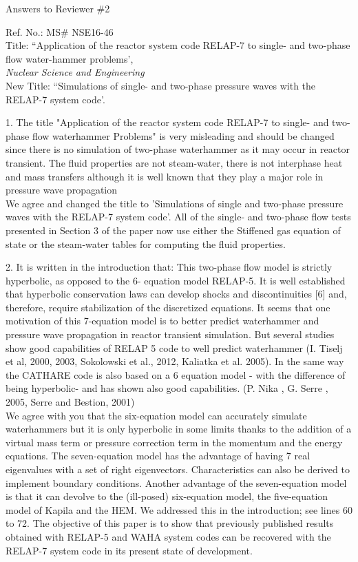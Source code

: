 \documentclass{article}
\begin{document}
\begin{center}
{ \Large Answers to Reviewer \#2}
\end{center}

\bigskip

\noindent Ref. No.: MS\# NSE16-46\\
Title: ``Application of the reactor system code RELAP-7 to single- and two-phase flow water-hammer problems', \\
{\it Nuclear Science and Engineering}\\
New Title: ``Simulations of single- and two-phase pressure waves with the RELAP-7 system code'.

\bigskip
\bigskip

{\color{blue}
1. The title "Application of the reactor system code RELAP-7 to single- and two-phase flow waterhammer Problems" is very misleading and should be changed since there is no simulation of two-phase waterhammer as it may occur in reactor transient. The fluid properties are not steam-water, there is not interphase heat and mass transfers although it is well known that they play a major role in pressure wave propagation
\\}
We agree and changed the title to 'Simulations of single and two-phase pressure waves with the RELAP-7 system code'. All of the single- and two-phase flow tests presented in Section 3 of the paper now use either the Stiffened gas equation of state or the steam-water tables for computing the fluid properties.
\bigskip

{\color{blue}
2. It is written in the introduction that:
This two-phase flow model is strictly hyperbolic, as opposed to the 6- equation model RELAP-5. It is well established that hyperbolic conservation laws can develop shocks and discontinuities [6] and, therefore, require stabilization of the discretized equations.
It seems that one motivation of this 7-equation model is to better predict waterhammer and pressure wave propagation in reactor transient simulation. But several studies show good capabilities of RELAP 5 code to well predict waterhammer (I. Tiselj et al, 2000, 2003, Sokolowski et al., 2012, Kaliatka et al. 2005). In the same way the CATHARE code is also based on a 6 equation model - with the difference of being hyperbolic- and has shown also good capabilities. (P. Nika , G. Serre , 2005, Serre and Bestion, 2001) \\
}
We agree with you that the six-equation model can accurately simulate waterhammers but it is only hyperbolic in some limits thanks to the addition of a virtual mass term or pressure correction term in the momentum and the energy equations. The seven-equation model has the advantage of having 7 real eigenvalues with a set of right eigenvectors. Characteristics can also be derived to implement boundary conditions. Another advantage of the seven-equation model is that it can devolve to the (ill-posed) six-equation model, the five-equation model of Kapila and the HEM. We addressed this in the introduction; see lines 60 to 72. The objective of this paper is to show that previously published results obtained with RELAP-5 and WAHA system codes can be recovered with the RELAP-7 system code in its present state of development.
\bigskip
\end{document}
